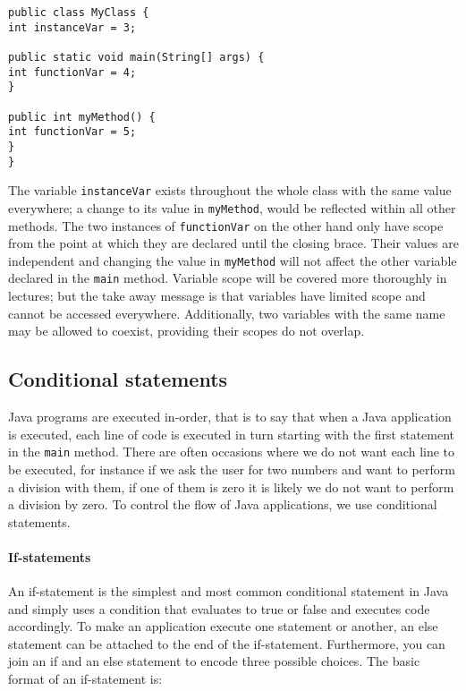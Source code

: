 \begin{verbatim}
public class MyClass {
int instanceVar = 3;

public static void main(String[] args) {
int functionVar = 4;
}

public int myMethod() {
int functionVar = 5;
}
}
\end{verbatim}

\noindent
The variable {\tt instanceVar} exists throughout the whole class with the same value everywhere; a change to its value in {\tt myMethod}, would be reflected within all other methods. The two instances of {\tt functionVar} on the other hand only have scope from the point at which they are declared until the closing brace. Their values are independent and changing the value in {\tt myMethod} will not affect the other variable declared in the {\tt main} method. Variable scope will be covered more thoroughly in lectures; but the take away message is that variables have limited scope and cannot be accessed everywhere. Additionally, two variables with the same name may be allowed to coexist, providing their scopes do not overlap.

\subsection{Conditional statements}

Java programs are executed in-order, that is to say that when a Java application is executed, each line of code is executed in turn starting with the first statement in the {\tt main} method. There are often occasions where we do not want each line to be executed, for instance if we ask the user for two numbers and want to perform a division with them, if one of them is zero it is likely we do not want to perform a division by zero. To control the flow of Java applications, we use conditional statements.

\paragraph{If-statements} An if-statement is the simplest and most common conditional statement in Java and simply uses a condition that evaluates to true or false and executes code accordingly. To make an application execute one statement or another, an else statement can be attached to the end of the if-statement. Furthermore, you can join an if and an else statement to encode three possible choices. The basic format of an if-statement is:

